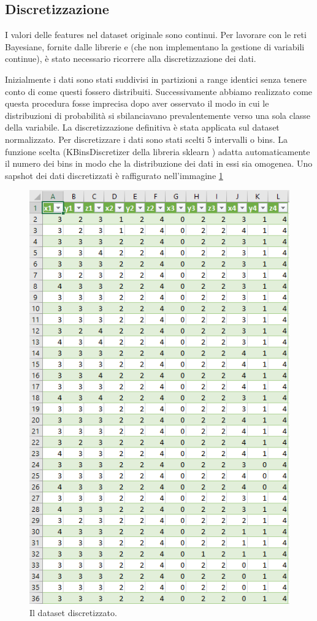 \documentclass[12pt]{article}
\begin{document}
\subsection{Discretizzazione}
I valori delle features nel dataset originale sono continui. Per lavorare con le reti Bayesiane, fornite dalle librerie \cite{scikit-learn} e \cite{pomegranate} (che non implementano la gestione di variabili continue), è stato necessario ricorrere alla discretizzazione dei dati.\par
Inizialmente i dati sono stati suddivisi in partizioni a range identici senza tenere conto di come questi fossero distribuiti. Successivamente abbiamo realizzato come questa procedura fosse imprecisa dopo aver osservato il modo in cui le distribuzioni di probabilità si sbilanciavano prevalentemente verso una sola classe della variabile. \newline
La discretizzazione definitiva è stata applicata sul dataset normalizzato. Per discretizzare i dati sono stati scelti 5 intervalli o bins. La funzione scelta (KBinsDiscretizer della libreria sklearn \cite{scikit-learn}) adatta automaticamente il numero dei bins in modo che la distribuzione dei dati in essi sia omogenea. Uno sapshot dei dati discretizzati è raffigurato nell'immagine \ref{fig:discretized}

\begin{figure}[h]
	\includegraphics[scale = 0.5]{images/datasetDiscretizzato.PNG}
	\caption{Il dataset discretizzato.}
	\label{fig:discretized}
\end{figure}
\end{document}

